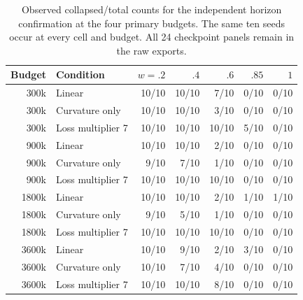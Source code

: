 \begin{table}[t]
\centering\small
\caption{Observed collapsed/total counts for the independent horizon confirmation at the four primary budgets. The same ten seeds occur at every cell and budget. All 24 checkpoint panels remain in the raw exports.}
\label{tab:confirmed_cells}
\begin{tabular}{@{}rlrrrrr@{}}\toprule
Budget & Condition & $w=.2$ & $.4$ & $.6$ & $.85$ & $1$ \\
\midrule
300k & Linear & 10/10 & 10/10 & 7/10 & 0/10 & 0/10 \\
300k & Curvature only & 10/10 & 10/10 & 3/10 & 0/10 & 0/10 \\
300k & Loss multiplier 7 & 10/10 & 10/10 & 10/10 & 5/10 & 0/10 \\
900k & Linear & 10/10 & 10/10 & 2/10 & 0/10 & 0/10 \\
900k & Curvature only & 9/10 & 7/10 & 1/10 & 0/10 & 0/10 \\
900k & Loss multiplier 7 & 10/10 & 10/10 & 10/10 & 0/10 & 0/10 \\
1800k & Linear & 10/10 & 10/10 & 2/10 & 1/10 & 1/10 \\
1800k & Curvature only & 9/10 & 5/10 & 1/10 & 0/10 & 0/10 \\
1800k & Loss multiplier 7 & 10/10 & 10/10 & 10/10 & 0/10 & 0/10 \\
3600k & Linear & 10/10 & 9/10 & 2/10 & 3/10 & 0/10 \\
3600k & Curvature only & 10/10 & 7/10 & 4/10 & 0/10 & 0/10 \\
3600k & Loss multiplier 7 & 10/10 & 10/10 & 8/10 & 0/10 & 0/10 \\
\bottomrule\end{tabular}
\end{table}
